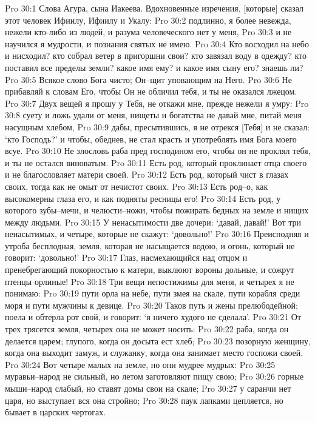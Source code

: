 Pro 30:1  Слова Агура, сына Иакеева. Вдохновенные изречения, [которые] сказал этот человек Ифиилу, Ифиилу и Укалу:
Pro 30:2  подлинно, я более невежда, нежели кто-либо из людей, и разума человеческого нет у меня,
Pro 30:3  и не научился я мудрости, и познания святых не имею.
Pro 30:4  Кто восходил на небо и нисходил? кто собрал ветер в пригоршни свои? кто завязал воду в одежду? кто поставил все пределы земли? какое имя ему? и какое имя сыну его? знаешь ли?
Pro 30:5  Всякое слово Бога чисто; Он--щит уповающим на Него.
Pro 30:6  Не прибавляй к словам Его, чтобы Он не обличил тебя, и ты не оказался лжецом.
Pro 30:7  Двух вещей я прошу у Тебя, не откажи мне, прежде нежели я умру:
Pro 30:8  суету и ложь удали от меня, нищеты и богатства не давай мне, питай меня насущным хлебом,
Pro 30:9  дабы, пресытившись, я не отрекся [Тебя] и не сказал: `кто Господь?' и чтобы, обеднев, не стал красть и употреблять имя Бога моего всуе.
Pro 30:10  Не злословь раба пред господином его, чтобы он не проклял тебя, и ты не остался виноватым.
Pro 30:11  Есть род, который проклинает отца своего и не благословляет матери своей.
Pro 30:12  Есть род, который чист в глазах своих, тогда как не омыт от нечистот своих.
Pro 30:13  Есть род--о, как высокомерны глаза его, и как подняты ресницы его!
Pro 30:14  Есть род, у которого зубы--мечи, и челюсти--ножи, чтобы пожирать бедных на земле и нищих между людьми.
Pro 30:15  У ненасытимости две дочери: `давай, давай!' Вот три ненасытимых, и четыре, которые не скажут: `довольно!'
Pro 30:16  Преисподняя и утроба бесплодная, земля, которая не насыщается водою, и огонь, который не говорит: `довольно!'
Pro 30:17  Глаз, насмехающийся над отцом и пренебрегающий покорностью к матери, выклюют вороны дольные, и сожрут птенцы орлиные!
Pro 30:18  Три вещи непостижимы для меня, и четырех я не понимаю:
Pro 30:19  пути орла на небе, пути змея на скале, пути корабля среди моря и пути мужчины к девице.
Pro 30:20  Таков путь и жены прелюбодейной; поела и обтерла рот свой, и говорит: `я ничего худого не сделала'.
Pro 30:21  От трех трясется земля, четырех она не может носить:
Pro 30:22  раба, когда он делается царем; глупого, когда он досыта ест хлеб;
Pro 30:23  позорную женщину, когда она выходит замуж, и служанку, когда она занимает место госпожи своей.
Pro 30:24  Вот четыре малых на земле, но они мудрее мудрых:
Pro 30:25  муравьи--народ не сильный, но летом заготовляют пищу свою;
Pro 30:26  горные мыши--народ слабый, но ставят домы свои на скале;
Pro 30:27  у саранчи нет царя, но выступает вся она стройно;
Pro 30:28  паук лапками цепляется, но бывает в царских чертогах.

